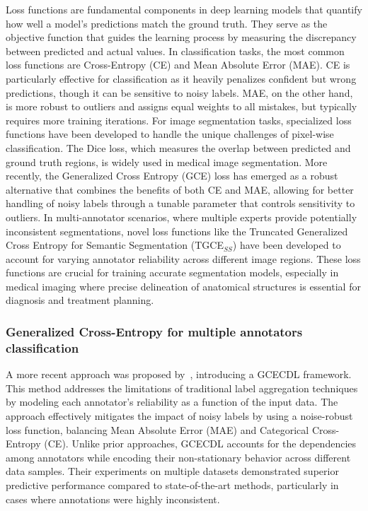Loss functions are fundamental components in deep learning models
that quantify how well a model's predictions match the ground truth.
They serve as the objective function that guides the learning process
by measuring the discrepancy between predicted and actual values. In
classification tasks, the most common loss functions are
Cross-Entropy (CE) and Mean Absolute Error (MAE). CE is particularly
effective for classification as it heavily penalizes confident but
wrong predictions, though it can be sensitive to noisy labels. MAE,
on the other hand, is more robust to outliers and assigns equal
weights to all mistakes, but typically requires more training
iterations. For image segmentation tasks, specialized loss functions
have been developed to handle the unique challenges of pixel-wise
classification. The Dice loss, which measures the overlap between
predicted and ground truth regions, is widely used in medical image
segmentation. More recently, the Generalized Cross Entropy (GCE) loss
has emerged as a robust alternative that combines the benefits of
both CE and MAE, allowing for better handling of noisy labels through
a tunable parameter that controls sensitivity to outliers. In
multi-annotator scenarios, where multiple experts provide potentially
inconsistent segmentations, novel loss functions like the Truncated
Generalized Cross Entropy for Semantic Segmentation (TGCE$_{SS}$)
have been developed to account for varying annotator reliability
across different image regions. These loss functions are crucial for
training accurate segmentation models, especially in medical imaging
where precise delineation of anatomical structures is essential for
diagnosis and treatment planning.

\subsubsection{Generalized Cross-Entropy for multiple annotators classification}

A more recent approach was proposed by~\cite{TrianaEtAl2023},
introducing a \gls{GCECDL} framework. This method addresses the limitations of
traditional label aggregation techniques by modeling each annotator's
reliability as a function of the input data. The approach effectively
mitigates the impact of noisy labels by using a noise-robust loss
function, balancing Mean Absolute Error (MAE) and Categorical
Cross-Entropy (CE). Unlike prior approaches, \gls{GCECDL} accounts for the
dependencies among annotators while encoding their non-stationary
behavior across different data samples. Their experiments on
multiple datasets demonstrated superior predictive performance
compared to state-of-the-art methods, particularly in cases where
annotations were highly inconsistent.

